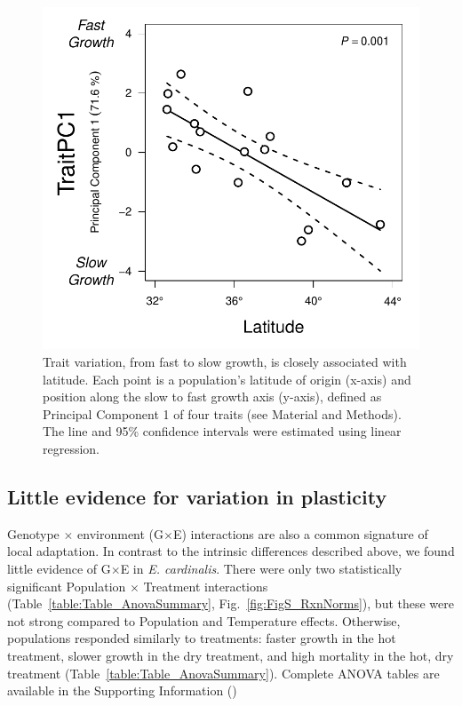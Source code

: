 \documentclass[11pt, oneside]{article}
\begin{document}

\begin{figure}[h!]
	\centerline{\includegraphics[width=1\textwidth]{Figures/Figure_PC1vLat.pdf}}
	\fontsize{10}{12}
	\selectfont
	\caption[Southern populations grow faster]{Trait variation, from fast to slow growth, is closely associated with latitude. Each point is a population's latitude of origin (x-axis) and position along the slow to fast growth axis (y-axis), defined as Principal Component 1 of four traits (see Material and Methods). The line and 95\% confidence intervals were estimated using linear regression.}
	\label{fig:Fig_PC1vLat}
\end{figure}

\subsection*{Little evidence for variation in plasticity}

Genotype $\times$ environment (G$\times$E) interactions are also a common signature of local adaptation. In contrast to the intrinsic differences described above, we found little evidence of G$\times$E in \textit{E. cardinalis}. There were only two statistically significant Population $\times$ Treatment interactions (Table~\ref{table:Table_AnovaSummary}, Fig.~\ref{fig:FigS_RxnNorms}), but these were not strong compared to Population and Temperature effects. Otherwise, populations responded similarly to treatments: faster growth in the hot treatment, slower growth in the dry treatment, and high mortality in the hot, dry treatment (Table~\ref{table:Table_AnovaSummary}). Complete ANOVA tables are available in the Supporting Information ()
\end{document}
